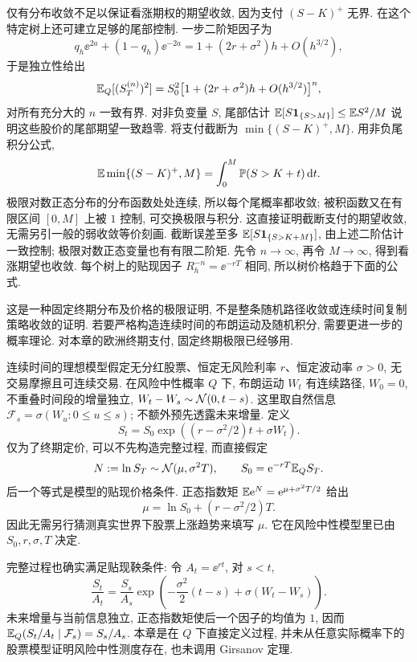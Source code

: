 仅有分布收敛不足以保证看涨期权的期望收敛, 因为支付 $(S-K)^+$ 无界. 在这个特定树上还可建立足够的尾部控制. 一步二阶矩因子为
\[
 q_h\ee^{2a}+(1-q_h)\ee^{-2a}
 =1+(2r+\sigma^2)h+O(h^{3/2}),
\]
于是独立性给出
\[
 \mathbb E_Q[(S_T^{(n)})^2]
 =S_0^2\bigl[1+(2r+\sigma^2)h+O(h^{3/2})\bigr]^n,
\]
对所有充分大的 $n$ 一致有界. 对非负变量 $S$, 尾部估计
$\mathbb E[S\mathbf 1_{\{S>M\}}]\leq\mathbb E S^2/M$ 说明这些股价的尾部期望一致趋零. 将支付截断为
$\min\{(S-K)^+,M\}$. 用非负尾积分公式,
\[
 \mathbb E\min\{(S-K)^+,M\}=\int_0^M\mathbb P(S>K+t)\,\mathrm d t.
\]
极限对数正态分布的分布函数处处连续, 所以每个尾概率都收敛; 被积函数又在有限区间 $[0,M]$ 上被 $1$ 控制, 可交换极限与积分. 这直接证明截断支付的期望收敛, 无需另引一般的弱收敛等价刻画. 截断误差至多 $\mathbb E[S\mathbf 1_{\{S>K+M\}}]$, 由上述二阶估计一致控制; 极限对数正态变量也有有限二阶矩. 先令 $n\to\infty$, 再令 $M\to\infty$, 得到看涨期望也收敛. 每个树上的贴现因子 $R_h^{-n}=\ee^{-rT}$ 相同, 所以树价格趋于下面的公式.

这是一种固定终期分布及价格的极限证明, 不是整条随机路径收敛或连续时间复制策略收敛的证明. 若要严格构造连续时间的布朗运动及随机积分, 需要更进一步的概率理论. 对本章的欧洲终期支付, 固定终期极限已经够用.

\label{sec:bs}
连续时间的理想模型假定无分红股票、恒定无风险利率 $r$、恒定波动率 $\sigma>0$, 无交易摩擦且可连续交易. 在风险中性概率 $Q$ 下, 布朗运动 $W_t$ 有连续路径, $W_0=0$, 不重叠时间段的增量独立, $W_t-W_s\sim\mathcal N(0,t-s)$. 这里取自然信息 $\mathcal F_s=\sigma(W_u:0\le u\le s)$; 不额外预先透露未来增量. 定义
\[
 S_t=S_0\exp\left((r-\sigma^2/2)t+\sigma W_t\right).
\]
仅为了终期定价, 可以不先构造完整过程, 而直接假定
\[
 N:=\ln S_T\sim\mathcal N(\mu,\sigma^2T),\qquad
 S_0=\mathrm e^{-rT}\mathbb E_QS_T.
\]
后一个等式是模型的贴现价格条件. 正态指数矩 $\mathbb E\mathrm e^N=\mathrm e^{\mu+\sigma^2T/2}$ 给出
\[
 \mu=\ln S_0+(r-\sigma^2/2)T.
\]
因此无需另行猜测真实世界下股票上涨趋势来填写 $\mu$. 它在风险中性模型里已由 $S_0,r,\sigma,T$ 决定.

完整过程也确实满足贴现鞅条件: 令 $A_t=\ee^{rt}$, 对 $s<t$,
\[
 \frac{S_t}{A_t}=\frac{S_s}{A_s}
 \exp\left(-\frac{\sigma^2}2(t-s)+\sigma(W_t-W_s)\right).
\]
未来增量与当前信息独立, 正态指数矩使后一个因子的均值为 $1$, 因而
$\mathbb E_Q(S_t/A_t\mid\mathcal F_s)=S_s/A_s$. 本章是在 $Q$ 下直接定义过程, 并未从任意实际概率下的股票模型证明风险中性测度存在, 也未调用 Girsanov 定理.

